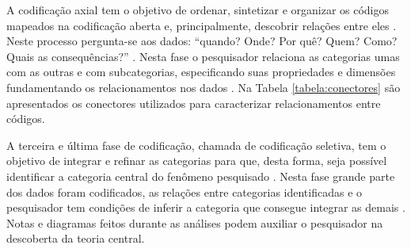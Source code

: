 A codificação axial tem o objetivo de ordenar, sintetizar e organizar os códigos mapeados na codificação aberta e, principalmente, descobrir relações entre eles \cite{cresswell:98}. Neste processo pergunta-se aos dados: ``quando? Onde? Por quê? Quem? Como? Quais as consequências?'' \cite[p. 125]{corbin:98}. Nesta fase o pesquisador relaciona as categorias umas com as outras e com subcategorias, especificando suas propriedades e dimensões fundamentando os relacionamentos nos dados \cite{charmaz:14}. Na Tabela \ref{tabela:conectores} são apresentados os conectores utilizados para caracterizar relacionamentos entre códigos.

\begin{table}[h!]
\centering
{}
\caption{Conectores de códigos, adaptado de }
\label{tabela:conectores}
\end{table}

A terceira e última fase de codificação, chamada de codificação seletiva, tem o objetivo de integrar e refinar as categorias para que, desta forma, seja possível identificar a categoria central do fenômeno pesquisado \cite{corbin:98}. Nesta fase grande parte dos dados foram codificados, as relações entre categorias identificadas e o pesquisador tem condições de inferir a categoria que consegue integrar as demais \cite{bandeira:03}. Notas e diagramas feitos durante as análises podem auxiliar o pesquisador na descoberta da teoria central.



